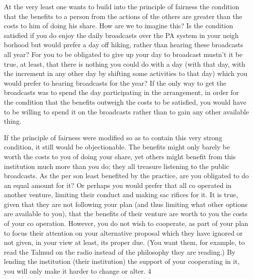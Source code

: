\documentclass[11pt,openany]{book}
\begin{document}
At the very least one wants to build into the principle of fairness the condition that the benefits to a person from the actions of the others are greater than the costs to him of doing his share. How are we to imagine this? Is the condition satisfied if you do enjoy the daily broadcasts over the PA system in your neigh borhood but would prefer a day off hiking, rather than hearing these broadcasts all year? For you to be obligated to give up your day to broadcast mustn't it be true, at least, that there is nothing you could do with a day (with that day, with the increment in any other day by shifting some activities to that day) which you would prefer to hearing broadcasts for the year? If the only way to get the broadcasts was to spend the day participating in the arrangement, in order for the condition that the benefits outweigh the costs to be satisfied, you would have to be willing to spend it on the broadcasts rather than to gain any other available thing. 

If the principle of fairness were modified so as to contain this very strong condition, it still would be objectionable. The benefits might only barely be worth the costs to you of doing your share, yet others might benefit from this institution much more than you do; they all treasure listening to the public broadcasts. As the per son least benefited by the practice, are you obligated to do an equal amount for it? Or perhaps you would prefer that all co operated in another venture, limiting their conduct and making sac rifices for it. It is true, given that they are not following your plan (and thus limiting what other options are available to you), that the benefits of their venture are worth to you the costs of your co operation. However, you do not wish to cooperate, as part of your plan to focus their attention on your alternative proposal which they have ignored or not given, in your view at least, its proper due. (You want them, for example, to read the Talmud on the radio instead of the philosophy they are reading.) By lending the institution (their institution) the support of your cooperating in it, you will only make it harder to change or alter. 4 
\end{document}
